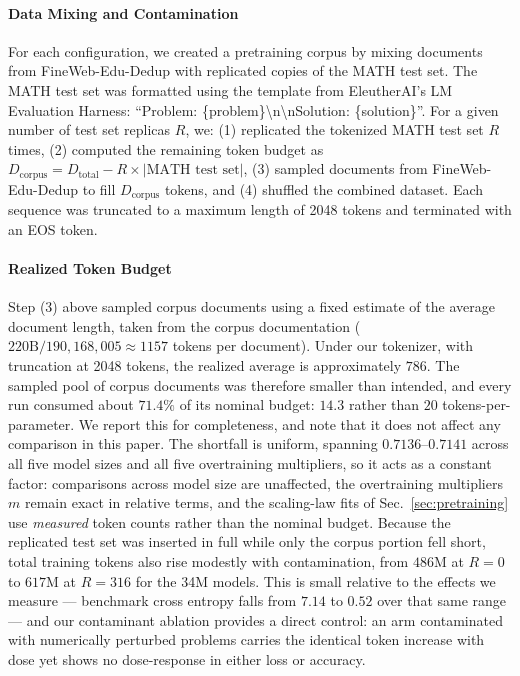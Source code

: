 \paragraph{Data Mixing and Contamination}
For each configuration, we created a pretraining corpus by mixing documents from FineWeb-Edu-Dedup \citep{penedo2024finewebdatasetsdecantingweb} with replicated copies of the MATH test set.
The MATH test set was formatted using the template from EleutherAI's LM Evaluation Harness: ``Problem: \{problem\}\textbackslash n\textbackslash nSolution: \{solution\}''.
For a given number of test set replicas $R$, we:
(1) replicated the tokenized MATH test set $R$ times,
(2) computed the remaining token budget as $D_{\text{corpus}} = D_{\text{total}} - R \times |\text{MATH test set}|$,
(3) sampled documents from FineWeb-Edu-Dedup to fill $D_{\text{corpus}}$ tokens, and
(4) shuffled the combined dataset.
Each sequence was truncated to a maximum length of 2048 tokens and terminated with an EOS token.

\paragraph{Realized Token Budget}
Step (3) above sampled corpus documents using a fixed estimate of the average document length, taken from the corpus documentation ($220\text{B}/190{,}168{,}005 \approx 1157$ tokens per document).
Under our tokenizer, with truncation at 2048 tokens, the realized average is approximately $786$.
The sampled pool of corpus documents was therefore smaller than intended, and every run consumed about $71.4\%$ of its nominal budget: $14.3$ rather than $20$ tokens-per-parameter.
We report this for completeness, and note that it does not affect any comparison in this paper.
The shortfall is uniform, spanning $0.7136$--$0.7141$ across all five model sizes and all five overtraining multipliers, so it acts as a constant factor: comparisons across model size are unaffected, the overtraining multipliers $m$ remain exact in relative terms, and the scaling-law fits of Sec.~\ref{sec:pretraining} use \emph{measured} token counts rather than the nominal budget.
Because the replicated test set was inserted in full while only the corpus portion fell short, total training tokens also rise modestly with contamination, from $486$M at $R=0$ to $617$M at $R=316$ for the 34M models.
This is small relative to the effects we measure --- benchmark cross entropy falls from $7.14$ to $0.52$ over that same range --- and our contaminant ablation provides a direct control: an arm contaminated with numerically perturbed problems carries the identical token increase with dose yet shows no dose-response in either loss or accuracy.


